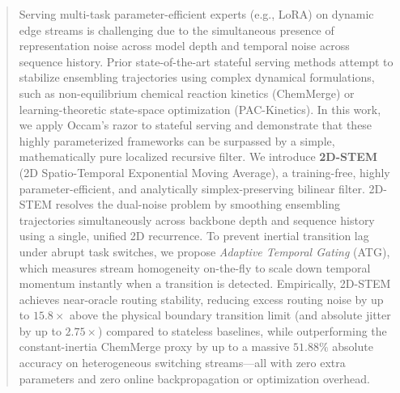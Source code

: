 \begin{abstract}
Serving multi-task parameter-efficient experts (e.g., LoRA) on dynamic edge streams is challenging due to the simultaneous presence of representation noise across model depth and temporal noise across sequence history. Prior state-of-the-art stateful serving methods attempt to stabilize ensembling trajectories using complex dynamical formulations, such as non-equilibrium chemical reaction kinetics (ChemMerge) or learning-theoretic state-space optimization (PAC-Kinetics). In this work, we apply Occam's razor to stateful serving and demonstrate that these highly parameterized frameworks can be surpassed by a simple, mathematically pure localized recursive filter. We introduce \textbf{2D-STEM} (2D Spatio-Temporal Exponential Moving Average), a training-free, highly parameter-efficient, and analytically simplex-preserving bilinear filter. 2D-STEM resolves the dual-noise problem by smoothing ensembling trajectories simultaneously across backbone depth and sequence history using a single, unified 2D recurrence. To prevent inertial transition lag under abrupt task switches, we propose \emph{Adaptive Temporal Gating} (ATG), which measures stream homogeneity on-the-fly to scale down temporal momentum instantly when a transition is detected. Empirically, 2D-STEM achieves near-oracle routing stability, reducing excess routing noise by up to $15.8\times$ above the physical boundary transition limit (and absolute jitter by up to $2.75\times$) compared to stateless baselines, while outperforming the constant-inertia ChemMerge proxy by up to a massive $51.88\%$ absolute accuracy on heterogeneous switching streams—all with zero extra parameters and zero online backpropagation or optimization overhead.
\end{abstract}